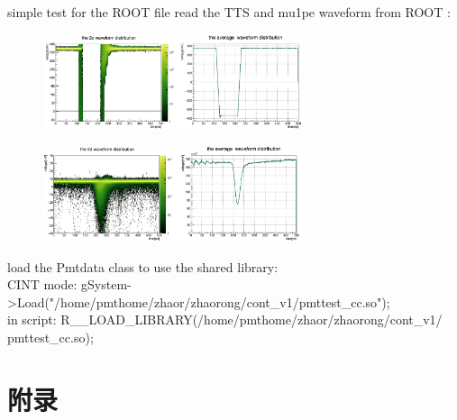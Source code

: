 \documentclass[11pt,compress,xcolor=x11names,UTF8]{beamer}
\begin{document}
\begin{frame}{simple test for the ROOT file}
read the TTS and mu1pe waveform from ROOT :
\begin{figure}
\centering
\includegraphics[width=0.68\textwidth]{ttswave} %
\end{figure}
\begin{figure}
\centering
\includegraphics[width=0.68\textwidth]{mu1pe} %
\end{figure}
\end{frame}



\begin{frame}

\end{frame}
\begin{frame}{load the Pmtdata class}
	to use the shared library:\\
CINT mode: gSystem->Load("/home/pmthome/zhaor/zhaorong/cont\_v1/pmttest\_cc.so");\\
in script: R\_\_LOAD\_LIBRARY(/home/pmthome/zhaor/zhaorong/cont\_v1/\\
	pmttest\_cc.so);
\end{frame}


%
%

\appendix

\section*{附录}
\end{document}
